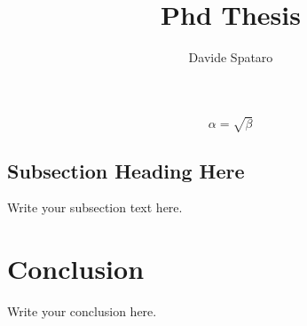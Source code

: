 \documentclass{report}
\begin{document}
\title{Phd Thesis}
\author{Davide Spataro}

\maketitle


\pagestyle{plain}
\setcounter{tocdepth}{5}

\tableofcontents



%


%





\begin{equation}
    \label{simple_equation}
    \alpha = \sqrt{ \beta }
\end{equation}

\subsection{Subsection Heading Here}
Write your subsection text here.


\section{Conclusion}
Write your conclusion here.
\end{document}
